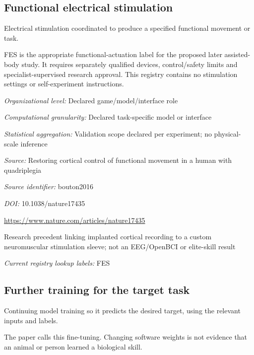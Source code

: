 \begin{samepage}
\subsection*{Functional electrical stimulation}
\noindent Electrical stimulation coordinated to produce a specified functional movement or task.\par
\end{samepage}
\noindent FES is the appropriate functional-actuation label for the proposed later assisted-body study. It requires separately qualified devices, control/safety limits and specialist-supervised research approval. This registry contains no stimulation settings or self-experiment instructions.\par
\noindent\textit{Organizational level:} Declared game/model/interface role\par
\noindent\textit{Computational granularity:} Declared task-specific model or interface\par
\begin{samepage}
\noindent\textit{Statistical aggregation:} Validation scope declared per experiment; no physical-scale inference\par\nopagebreak[4]

\end{samepage}
\noindent\textit{Source:} Restoring cortical control of functional movement in a human with quadriplegia\par
\noindent\textit{Source identifier:} bouton2016\par
\noindent\textit{DOI:} 10.1038/nature17435\par
\noindent\url{https://www.nature.com/articles/nature17435}\par
\noindent Research precedent linking implanted cortical recording to a custom neuromuscular stimulation sleeve; not an EEG/OpenBCI or elite-skill result\par


\noindent\textit{Current registry lookup labels:} FES\par

\begin{samepage}
\subsection*{Further training for the target task}
\noindent Continuing model training so it predicts the desired target, using the relevant inputs and labels.\par
\end{samepage}
\begin{samepage}
\noindent The paper calls this fine-tuning. Changing software weights is not evidence that an animal or person learned a biological skill.\par\nopagebreak[4]

\end{samepage}


